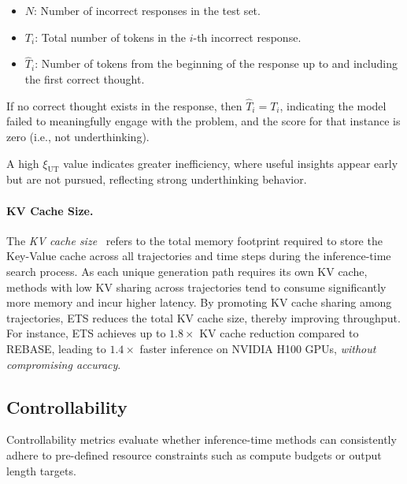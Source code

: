 \begin{itemize}
    \item $N$: Number of incorrect responses in the test set.
    \item $T_i$: Total number of tokens in the $i$-th incorrect response.
    \item $\hat{T}_i$: Number of tokens from the beginning of the response up to and including the first correct thought.
\end{itemize}

If no correct thought exists in the response, then $\hat{T}_i = T_i$, indicating the model failed to meaningfully engage with the problem, and the score for that instance is zero (i.e., not underthinking).

A high $\xi_{\mathrm{UT}}$ value indicates greater inefficiency, where useful insights appear early but are not pursued, reflecting strong underthinking behavior.

\paragraph{KV Cache Size.}
The \emph{KV cache size}~\citep{hooper2025etsefficienttreesearch} refers to the total memory footprint required to store the Key-Value cache across all trajectories and time steps during the inference-time search process. As each unique generation path requires its own KV cache, methods with low KV sharing across trajectories tend to consume significantly more memory and incur higher latency.
By promoting KV cache sharing among trajectories, ETS reduces the total KV cache size, thereby improving throughput. For instance, ETS achieves up to $1.8\times$ KV cache reduction compared to REBASE, leading to $1.4\times$ faster inference on NVIDIA H100 GPUs, \emph{without compromising accuracy}.


\subsection{Controllability}
\label{subsec:controllability}
Controllability metrics evaluate whether inference-time methods can consistently adhere to pre-defined resource constraints such as compute budgets or output length targets.

